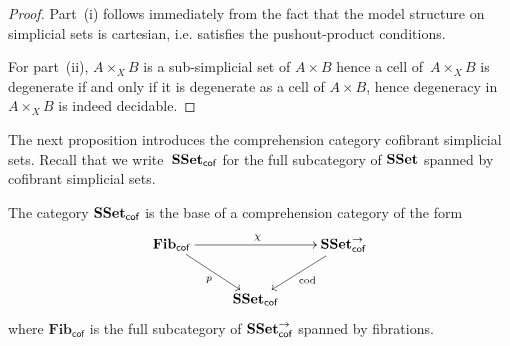 \documentclass[reqno,10pt,a4paper,oneside,draft]{amsart}
\begin{document}
\begin{proof} Part~(i) follows immediately from the fact that the model structure on simplicial sets is cartesian, i.e. satisfies the pushout-product conditions.


For part~(ii), $A \times_X B$ is a sub-simplicial set of $A \times B$ hence a cell of~$A \times_X B$ is degenerate if and only if it is degenerate as a cell of $A \times B$, hence degeneracy
in~$A \times_X B$ is indeed decidable. 
\end{proof}


The next proposition introduces the  comprehension category  cofibrant simplicial sets.
Recall that we write~$\mathbf{SSet}_{\mathsf{cof}}$ for the full subcategory of $\mathbf{SSet}$ spanned by
cofibrant simplicial sets. 


\begin{proposition} \label{thm:compcat}
The category $\mathbf{SSet}_{\mathsf{cof}}$ is the base of a comprehension category
of the form
\begin{equation*}
\begin{gathered}
\xymatrix{
\mathbf{Fib}_{ \mathsf{cof}} \ar[dr]_{p} \ar[rr]^{\chi} & & \SSet^{\to}_{\mathsf{cof}} \ar[dl]^{\mathrm{cod}} \\ 
 & \SSet_{\mathsf{cof}} &  }
 \end{gathered}
 \end{equation*}
 where $\mathbf{Fib}_{ \mathsf{cof}}$ is the full subcategory of $\mathbf{SSet}^{\to}_{\mathsf{cof}}$ spanned by fibrations.
\end{proposition} 
\end{document}
